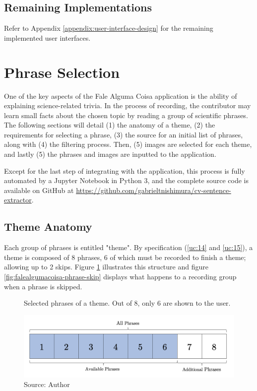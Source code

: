 \subsection{Remaining Implementations}

Refer to Appendix \ref{appendix:user-interface-design} for the remaining implemented user interfaces.

\clearpage
\section{Phrase Selection}
\label{sec:app-phrase-selection}

One of the key aspects of the Fale Alguma Coisa application is the ability of explaining science-related trivia. In the process of recording, the contributor may learn small facts about the chosen topic by reading a group of scientific phrases. The following sections will detail (1) the anatomy of a theme, (2) the requirements for selecting a phrase, (3) the source for an initial list of phrases, along with (4) the filtering process. Then, (5) images are selected for each theme, and lastly (5) the phrases and images are inputted to the application. 

Except for the last step of integrating with the application, this process is fully automated by a Jupyter Notebook in Python 3, and the complete source code is available on GitHub at \url{https://github.com/gabrieltnishimura/cv-sentence-extractor}.

\subsection{Theme Anatomy}

Each group of phrases is entitled "theme". By specification (\ref{uc:14} and \ref{uc:15}), a theme is composed of 8 phrases, 6 of which must be recorded to finish a theme; allowing up to 2 skips. Figure \ref{fig:falealgumacoisa-phrase-all} illustrates this structure and figure \ref{fig:falealgumacoisa-phrase-skip} displays what happens to a recording group when a phrase is skipped.

\begin{figure}[h]
    \centering
    \caption{Selected phrases of a theme. Out of 8, only 6 are shown to the user.}
    \label{fig:falealgumacoisa-phrase-all}
    \includegraphics[width=\linewidth]{images/phrase-selection/phrase-all.png}
    \caption*{Source: Author}
\end{figure}

